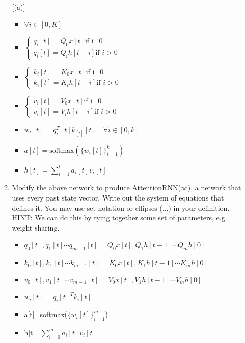 \documentclass{article}
\begin{document}
\begin{enumerate}[(a)]
\begin{enumerate} [(a)]
\begin{itemize}
            \color{blue}
            \item $\forall i\in [0,K]$
             \item $\begin{cases}
                q_{i}[t]=Q_0x[t] \text{if i=0}\\
                q_{i}[t]=Q_{i}h[t-i] \text{if } i> 0
            \end{cases}$
            \item $\begin{cases}
                k_{i}[t]=K_0x[t] \text{if i=0}\\
                k_{i}[t]=K_{i}h[t-i] \text{if } i> 0
            \end{cases}$
            \item $\begin{cases}
                v_{i}[t]=V_0x[t] \text{if i=0}\\
                v_{i}[t]=V_{i}h[t-i] \text{if } i> 0
            \end{cases}$
            \item $w_t[t]=q_{i}^{T}[t]k_[i][t]\quad \forall i\in [0,k]$
            \item $a[t]=\text{softmax}(\{w_i[t]\}_{i=1}^{k})$
            \item $h[t]=\sum_{i=1}^{t}a_{i}[t]v_{i}[t]$
        \end{itemize}
        \item Modify the above network to produce AttentionRNN($\infty$), a network
        that uses every past state vector. Write out the system of equations that defines it. You may use set notation or ellipses (...) in your definition. HINT:
        We can do this by tying together some set of parameters, e.g. weight sharing.
        \begin{itemize}
            \color{blue}
            \item $q_{0}[t],q_{1}[t]\cdots q_{m-1}[t]=Q_{0}x[t], Q_{1}h[t-1]\cdots Q_{m}h[0]$
            \item $k_{0}[t],k_{1}[t]\cdots k_{m-1}[t]=K_{0}x[t], K_{1}h[t-1]\cdots K_{m}h[0]$
            \item $v_{0}[t],v_{1}[t]\cdots v_{m-1}[t]=V_{0}x[t], V_{1}h[t-1]\cdots V_{m}h[0]$
            \item $w_{i}[t]=q_{i}[t]^{T}k_{i}[t]$
            \item a[t]=softmax($\{w_{i}[t]\}_{i=1}^{m}$)
            \item h[t]=$\sum_{i=0}^{m}a_{i}[t]v_{i}[t]$
        \end{itemize}

\end{enumerate}
\end{enumerate}
\end{document}
